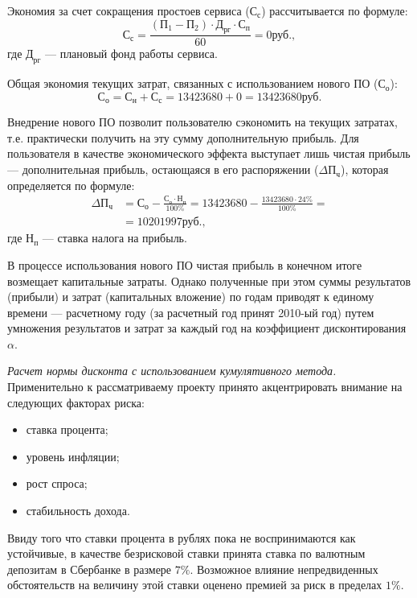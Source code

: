Экономия за счет сокращения простоев сервиса ($\text{С}_\text{с}$) рассчитывается по формуле:
\begin{displaymath}
  \text{С}_\text{с} = \frac{(\text{П}_\text{1} - \text{П}_\text{2}) \cdot \text{Д}_\text{рг} \cdot \text{С}_\text{п}}{60} = 0 \text{руб.},
\end{displaymath}
где $\text{Д}_\text{рг}$ --- плановый фонд работы сервиса.

Общая экономия текущих затрат, связанных с использованием нового ПО ($\text{С}_\text{о}$):
\begin{displaymath}
  \text{С}_\text{о} = \text{С}_\text{н} + \text{С}_\text{с} = 13423680 + 0 = 13423680 \text{руб.}
\end{displaymath}

Внедрение нового ПО позволит пользователю сэкономить на текущих затратах, т.е. практически получить на эту сумму дополнительную прибыль. Для пользователя в качестве экономического эффекта выступает лишь чистая прибыль --- дополнительная прибыль, остающаяся в его распоряжении ($\Delta\text{П}_{\text{ч}}$), которая определяется по формуле:
\begin{align*}
  \Delta\text{П}_{\text{ч}} &= \text{С}_\text{о} - \frac{\text{С}_\text{о} \cdot \text{Н}_\text{п}}{100\%} = 13423680 - \frac{13423680 \cdot 24\%}{100\%} =\\
  &= 10201997 \text{руб.},
\end{align*}
где $\text{Н}_\text{п}$ --- ставка налога на прибыль.

В процессе использования нового ПО чистая прибыль в конечном итоге возмещает капитальные затраты. Однако полученные при этом суммы результатов (прибыли) и затрат (капитальных вложение) по годам приводят к единому времени --- расчетному году (за расчетный год принят 2010-ый год) путем умножения результатов и затрат за каждый год на коэффициент дисконтирования $\alpha$.

\emph{Расчет нормы дисконта с использованием кумулятивного метода.} Применительно к рассматриваему проекту принято акцентрировать внимание на следующих факторах риска:
\begin{itemize}
  \item ставка процента;
  \item уровень инфляции;
  \item рост спроса;
  \item стабильность дохода.
\end{itemize}

Ввиду того что ставки процента в рублях пока не воспринимаются как устойчивые, в качестве безрисковой ставки принята ставка по валютным депозитам в Сбербанке в размере $7\%$. Возможное влияние непредвиденных обстоятельств на величину этой ставки оценено премией за риск в пределах $1\%$.


